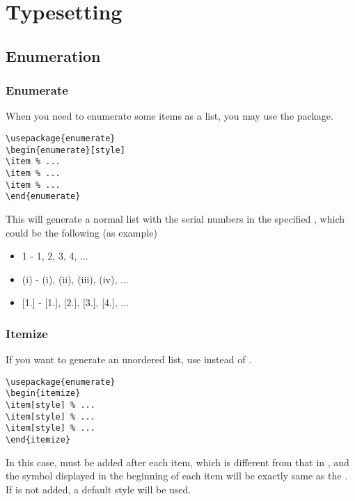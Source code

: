 \section{Typesetting}

\subsection{Enumeration}
\begin{frame}[fragile]
	\frametitle{Enumerate}
	When you need to enumerate some items as a list, you may use the  package.
	\begin{command}
		\begin{verbatim}
\usepackage{enumerate}
\begin{enumerate}[style]
\item % ...
\item % ...
\item % ...
\end{enumerate}
		\end{verbatim}
	\end{command}
	This will generate a normal list with the serial numbers in the specified , which could be the following (as example)
	\begin{itemize}
		\item \alert{1} - 1, 2, 3, 4, ...
		\item \alert{(i)} - (i), (ii), (iii), (iv), ...
		\item \alert{[1.]} - [1.], [2.], [3.], [4.], ...
	\end{itemize}
\end{frame}

\begin{frame}[fragile]
	\frametitle{Itemize}
	If you want to generate an unordered list, use  instead of .
	\begin{command}
		\begin{verbatim}
\usepackage{enumerate}
\begin{itemize}
\item[style] % ...
\item[style] % ...
\item[style] % ...
\end{itemize}
		\end{verbatim}
	\end{command}
	In this case,  must be added after each item, which is different from that in , and the symbol displayed in the beginning of each item will be exactly same as the . If  is not added, a default style will be used.
\end{frame}

